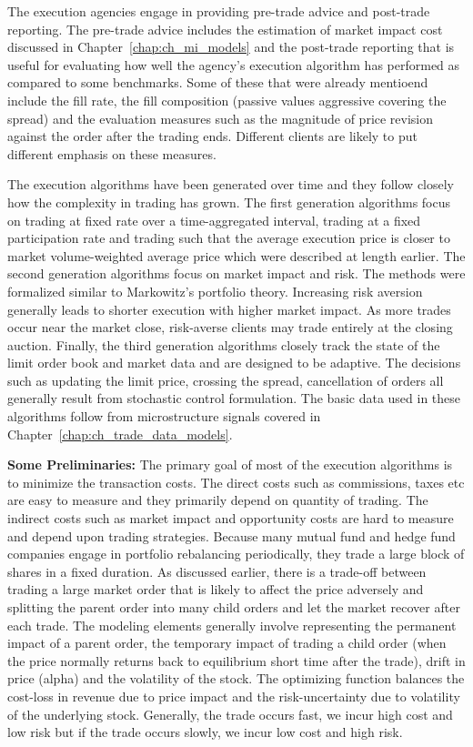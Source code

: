 The execution agencies engage in providing pre-trade advice and post-trade reporting. The pre-trade advice includes the estimation of market impact cost discussed in Chapter~\ref{chap:ch_mi_models} and the post-trade reporting that is useful for evaluating how well the agency's execution algorithm has performed as compared to some benchmarks. Some of these that were already mentioend include the fill rate, the fill composition (passive values aggressive covering the spread) and the evaluation measures such as the magnitude of price revision against the order after the trading ends. Different clients are likely to put different emphasis on these measures. 


The execution algorithms have been generated over time and they follow closely how the complexity in trading has grown. The first generation algorithms focus on trading at fixed rate over a time-aggregated interval, trading at a fixed participation rate and trading such that the average execution price is closer to market volume-weighted average price which were described at length earlier. The second generation algorithms focus on market impact and risk. The methods were formalized similar to Markowitz's portfolio theory. Increasing risk aversion generally leads to shorter execution with higher market impact. As more trades occur near the market close, risk-averse clients may trade entirely at the closing auction. Finally, the third generation algorithms closely track the state of the limit order book and market data and are designed to be adaptive. The decisions such as updating the limit price, crossing the spread, cancellation of orders all generally result from stochastic control formulation. The basic data used in these algorithms follow from microstructure signals covered in Chapter~\ref{chap:ch_trade_data_models}. \twomedskip


\noindent\textbf{Some Preliminaries:} The primary goal of most of the execution algorithms is to minimize the transaction costs. The direct costs such as commissions, taxes etc are easy to measure and they primarily depend on quantity of trading. The indirect costs such as market impact and opportunity costs are hard to measure and depend upon trading strategies. Because many mutual fund and hedge fund companies engage in portfolio rebalancing periodically, they trade a large block of shares in a fixed duration. As discussed earlier, there is a trade-off between trading a large market order that is likely to affect the price adversely and splitting the parent order into many child orders and let the market recover after each trade. The modeling elements generally involve representing the permanent impact of a parent order, the temporary impact of trading a child order (when the price normally returns back to equilibrium short time after the trade), drift in price (alpha) and the volatility of the stock. The optimizing function balances the cost-loss in revenue due to price impact and the risk-uncertainty due to volatility of the underlying stock. Generally, the trade occurs fast, we incur high cost and low risk but if the trade occurs slowly, we incur low cost and high risk.


